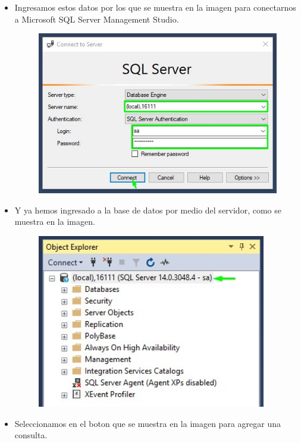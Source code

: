 \begin{itemize}
					
					\vspace{7cm}
				\item Ingresamos estos datos por los que se muestra en la imagen para conectarnos a Microsoft SQL Server Management Studio.
					\begin{figure}[htb]
						\begin{center}
							\includegraphics[width=12cm]{./Imagenes/ConectarseSql02}
						\end{center}
					\end{figure}
				\item Y ya hemos ingresado a la base de datos por medio del servidor, como se muestra en la imagen.
					\begin{figure}[htb]
						\begin{center}
							\includegraphics[width=10cm]{./Imagenes/ServidorLocal}
						\end{center}
					\end{figure}
					\vspace{5cm}
				\item Seleccionamos en el boton que se muestra en la imagen para agregar una consulta.

\end{itemize}
